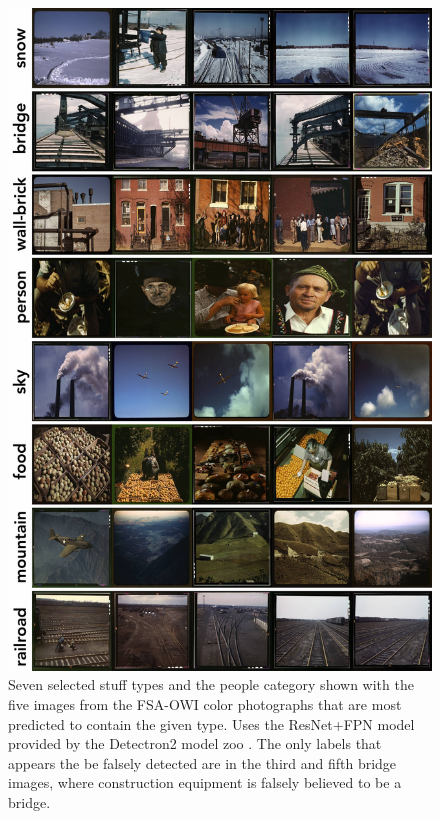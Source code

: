 \documentclass[10pt, a4paper]{article}
\begin{document}
\begin{figure}[!ht]
\begin{center}
\includegraphics[height=0.9\textheight]{../figures/max_category_grid_labels.jpg}
\caption{Seven selected stuff types and the people category
shown with the five images from the FSA-OWI color photographs that are most
predicted to contain the given type. Uses the ResNet+FPN model provided by the
Detectron2 model zoo \protect\cite{wu2019detectron2}.
The only labels that appears the be falsely detected are in the third and
fifth bridge images, where construction equipment is falsely believed to be a
bridge.}
\label{fig:stuff}
\end{center}
\end{figure}
\end{document}

